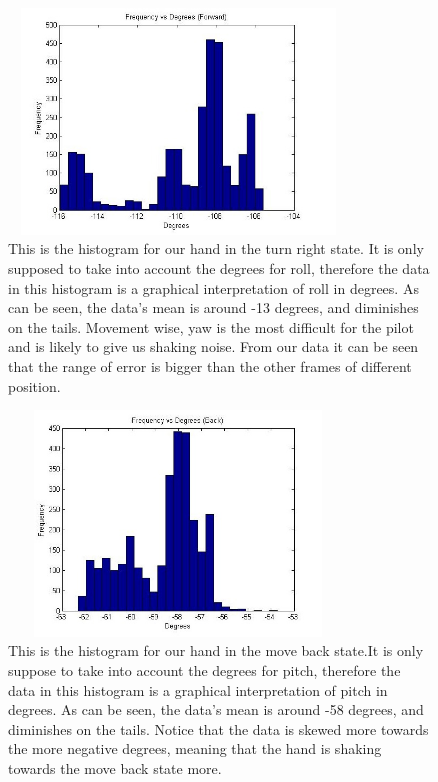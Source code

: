 \documentclass[letterpaper,english, 12pt]{article}
\begin{document}
\begin{figure}[H]
	\centering
	\includegraphics[height=6cm,width=90mm]{pics/forwardHistogram1.jpg}
	\caption{This is the histogram for our hand in the turn right state. It is only supposed to take into account the degrees for roll, therefore the data in this histogram is a graphical interpretation of roll in degrees.  As can be seen, the data's mean is around -13 degrees, and diminishes on the tails. Movement wise, yaw is the most difficult for the pilot and is likely to give us shaking noise.  From our data it can be seen that the range of error is bigger than the other frames of different position.}
\end{figure}

\begin{figure}[H]
	\centering
	\includegraphics[height=6cm,width=90mm]{pics/backwardHistogram1.jpg}
	\caption{This is the histogram for our hand in the move back state.It is only suppose to take into account the degrees for pitch, therefore the data in this histogram is a graphical interpretation of pitch in degrees.  As can be seen, the data's mean is around -58 degrees, and diminishes on the tails. Notice that the data is skewed more towards the more negative degrees, meaning that the hand is shaking towards the move back state more.} 

\end{figure}
\end{document}
